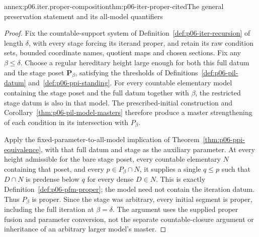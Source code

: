 \begin{annexitem}{annex:p06.iter.proper-composition}{thm:p06-iter-proper-cited}{The general preservation statement and its all-model quantifiers}
\begin{proof}
Fix the countable-support system of Definition~\ref{def:p06-iter-recursion}
of length \(\delta\), with every stage forcing its iterand proper, and
retain its raw condition sets, bounded coordinate names, quotient maps and
chosen sections. Fix any \(\beta\leq\delta\). Choose a regular hereditary
height large enough for both this full datum and the stage poset
\(\mathbf P_\beta\), satisfying the thresholds of
Definitions~\ref{def:p06-pil-datum} and~\ref{def:p06-ppi-standing}.
For every countable elementary model containing the stage poset and the
full datum together with \(\beta\), the restricted stage datum is also
in that model. The prescribed-initial construction and
Corollary~\ref{thm:p06-pil-model-masters} therefore produce a master
strengthening of each condition in its intersection with \(P_\beta\).

Apply the fixed-parameter-to-all-model implication of
Theorem~\ref{thm:p06-ppi-equivalence}, with that full datum and stage as
the auxiliary parameter. At every height admissible for the bare stage
poset, every countable elementary \(N\) containing that poset, and every
\(p\in P_\beta\cap N\), it supplies a single \(q\leq p\) such that
\(D\cap N\) is predense below \(q\) for every dense \(D\in N\).
This is exactly Definition~\ref{def:p06-pfm-proper}; the model need not
contain the iteration datum. Thus \(P_\beta\) is proper. Since the stage
was arbitrary, every initial segment is proper, including the full
iteration at \(\beta=\delta\). The argument uses the supplied proper
fusion and parameter conversion, not the separate countable-closure
argument or inheritance of an arbitrary larger model's master.
\end{proof}
\end{annexitem}
